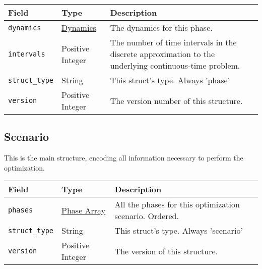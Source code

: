 \documentclass{article}
\begin{document}
			\begin{tabular}{ p{} | p{} | p{197pt}}
				Field                    & Type                               & Description                                      \\ \hline
				\lstinline|dynamics|     & \hyperref[sec:dynamics]{Dynamics}  & The dynamics for this phase.                     \\[1ex]
				\lstinline|intervals|    & \raggedright Positive Integer      & The number of time intervals in the
				                                                                discrete
				                                                                approximation to the underlying continuous-time
				                                                                problem.                                         \\[1ex]
				\lstinline|struct_type|  & String                             & This struct's type. Always 'phase'               \\[1ex]
				\lstinline|version|      & \raggedright Positive Integer      & The version number of this structure.
			\end{tabular}

		\subsection{Scenario}
			\label{sec:scenario} %

			This is the main structure, encoding all information necessary to perform the optimization.

			\vspace{\baselineskip}

			\begin{tabular}{ p{} | p{} | p{197pt}}
				Field                    & Type                               & Description                                      \\ \hline
				\lstinline|phases| & \raggedright \hyperref[sec:phase]{Phase Array} & All the phases for this optimization scenario.
				                                                                Ordered.                                         \\[1ex]
				\lstinline|struct_type|  & String                             & This struct's type. Always 'scenario'            \\[1ex]
				\lstinline|version|      & \raggedright Positive Integer      & The version of this structure.
			\end{tabular}
\end{document}
